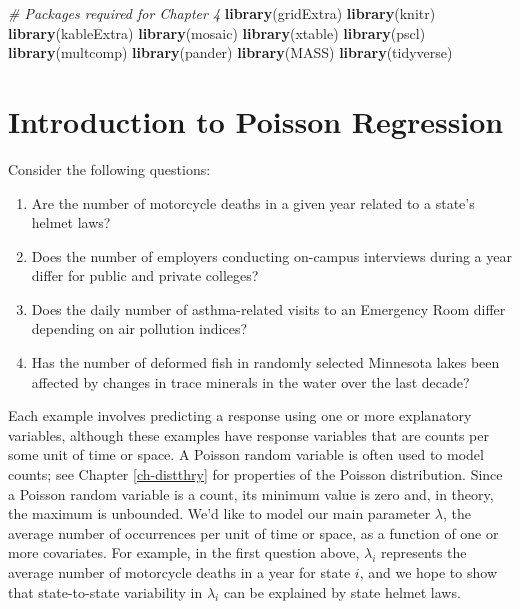 \documentclass[
]{krantz}
\newenvironment{Shaded}{\begin{snugshade}}{\end{snugshade}}
\newcommand{\CommentTok}[1]{\textcolor[rgb]{0.37,0.37,0.37}{\textit{#1}}}
\newcommand{\KeywordTok}[1]{\textcolor[rgb]{0.27,0.27,0.27}{\textbf{#1}}}
\newcommand{\NormalTok}[1]{#1}
\providecommand{\tightlist}{%
  \setlength{\itemsep}{0pt}\setlength{\parskip}{0pt}}
\begin{document}
\begin{Shaded}
\begin{Highlighting}[]
\CommentTok{# Packages required for Chapter 4}
\KeywordTok{library}\NormalTok{(gridExtra)}
\KeywordTok{library}\NormalTok{(knitr)}
\KeywordTok{library}\NormalTok{(kableExtra)}
\KeywordTok{library}\NormalTok{(mosaic)}
\KeywordTok{library}\NormalTok{(xtable)}
\KeywordTok{library}\NormalTok{(pscl) }
\KeywordTok{library}\NormalTok{(multcomp)}
\KeywordTok{library}\NormalTok{(pander)}
\KeywordTok{library}\NormalTok{(MASS)}
\KeywordTok{library}\NormalTok{(tidyverse)}
\end{Highlighting}
\end{Shaded}

\hypertarget{introduction-to-poisson-regression}{%
\section{Introduction to Poisson Regression}\label{introduction-to-poisson-regression}}

Consider the following questions:

\begin{enumerate}
\def\labelenumi{\arabic{enumi}.}
\tightlist
\item
  Are the number of motorcycle deaths in a given year related to a state's helmet laws?
\item
  Does the number of employers conducting on-campus interviews during a year differ for public and private colleges?
\item
  Does the daily number of asthma-related visits to an Emergency Room differ depending on air pollution indices?
\item
  Has the number of deformed fish in randomly selected Minnesota lakes been affected by changes in trace minerals in the water over the last decade?
\end{enumerate}

Each example involves predicting a response using one or more explanatory variables, although these examples have response variables that are counts per some unit of time or space. A Poisson random variable is often used to model counts; see Chapter \ref{ch-distthry} for properties of the Poisson distribution. Since a Poisson random variable is a count, its minimum value is zero and, in theory, the maximum is unbounded. We'd like to model our main parameter \(\lambda\), the average number of occurrences per unit of time or space, as a function of one or more covariates. For example, in the first question above, \(\lambda_i\) represents the average number of motorcycle deaths in a year for state \(i\), and we hope to show that state-to-state variability in \(\lambda_i\) can be explained by state helmet laws.
\end{document}
